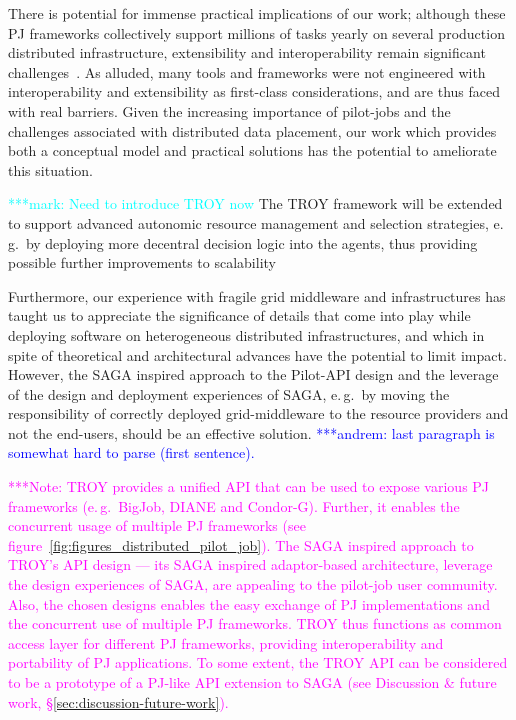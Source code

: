 \documentclass[conference,final]{IEEEtran}
\newcommand{\alnote}[1]{ {\textcolor{blue} { ***andrel: #1 }}}
\newcommand{\amnote}[1]{ {\textcolor{blue} { ***andrem: #1 }}}
\newcommand{\msnote}[1]{ {\textcolor{cyan} { ***mark: #1 }}}
\newcommand{\note}[1]{ {\textcolor{magenta} { ***Note: #1 }}}
\newcommand{\alnote}[1]{}
\newcommand{\amnote}[1]{}
\newcommand{\msnote}[1]{}
\newcommand{\note}[1]{}
\begin{document}
There is potential for immense practical implications of our work;
although these PJ frameworks collectively support millions of tasks
yearly on several production distributed infrastructure, extensibility
and interoperability remain significant challenges~\cite{extenci}.  As
alluded, many tools and frameworks were not engineered with
interoperability and extensibility as first-class considerations, and
are thus faced with real barriers. Given the increasing importance of
pilot-jobs and the challenges associated with distributed data
placement, our work which provides both a conceptual model and
practical solutions has the potential to ameliorate this situation.


\msnote{Need to introduce TROY now}
The TROY framework will be
extended to support advanced autonomic resource management and
selection strategies, e.\,g.\ by deploying more decentral decision
logic into the agents, thus providing possible further improvements to
scalability



Furthermore, our experience with fragile grid middleware and infrastructures
has taught us to appreciate the significance of details that come into play
while deploying software on heterogeneous distributed infrastructures, and which
in spite of theoretical and architectural advances have the potential to limit
impact. However, the SAGA inspired approach to the Pilot-API design and the
leverage of the design and deployment experiences of SAGA, e.\,g.\ by moving the
responsibility of correctly deployed grid-middleware to the resource providers
and not the end-users, should be an effective solution.
\amnote{last paragraph is somewhat hard to parse (first sentence).}


\note{TROY provides a
  unified API that can be used to expose various PJ frameworks
  (e.\,g.\ BigJob, DIANE and Condor-G). Further, it enables the
  concurrent usage of multiple PJ frameworks (see
  figure~\ref{fig:figures_distributed_pilot_job}).  The SAGA inspired
  approach to TROY's API design --- its SAGA inspired adaptor-based
  architecture, leverage the design experiences of SAGA, are appealing
  to the pilot-job user community. Also, the chosen designs enables
  the easy exchange of PJ implementations and the concurrent use of
  multiple PJ frameworks. TROY thus functions as common access layer
  for different PJ frameworks, providing interoperability and
  portability of PJ applications. To some extent, the TROY API can be
  considered to be a prototype of a PJ-like API extension to SAGA (see
  Discussion \& future work, \S\ref{sec:discussion-future-work}).}
\end{document}
